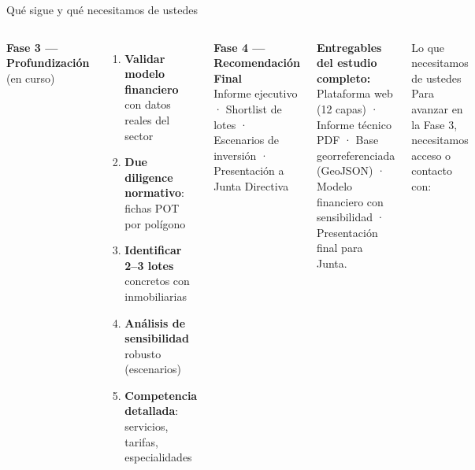 \documentclass[aspectratio=169, 11pt]{beamer}
\begin{document}
\begin{frame}{Qué sigue y qué necesitamos de ustedes}

\begin{columns}[T]
{\small\textbf{Fase 3 — Profundización} (en curso)}

\vspace{3pt}
\begin{enumerate}\scriptsize
  \setlength{\itemsep}{1pt}
  \item[\textcolor{teal}{\textbf{1.}}] \textbf{Validar modelo financiero} con datos reales del sector
  \item[\textcolor{teal}{\textbf{2.}}] \textbf{Due diligence normativo}: fichas POT por polígono
  \item[\textcolor{teal}{\textbf{3.}}] \textbf{Identificar 2--3 lotes} concretos con inmobiliarias
  \item[\textcolor{teal}{\textbf{4.}}] \textbf{Análisis de sensibilidad} robusto (escenarios)
  \item[\textcolor{teal}{\textbf{5.}}] \textbf{Competencia detallada}: servicios, tarifas, especialidades
\end{enumerate}

\vspace{4pt}
{\small\textbf{Fase 4 — Recomendación Final}}\\
{\scriptsize Informe ejecutivo · Shortlist de lotes · Escenarios de inversión · Presentación a Junta Directiva}

\vspace{4pt}
{\scriptsize\textbf{Entregables del estudio completo:} Plataforma web (12 capas) · Informe técnico PDF · Base georreferenciada (GeoJSON) · Modelo financiero con sensibilidad · Presentación final para Junta.}

\begin{alertblock}{\small Lo que necesitamos de ustedes}
\scriptsize Para avanzar en la Fase 3, necesitamos acceso o contacto con:


\end{alertblock}
\end{columns}
\end{frame}
\end{document}
